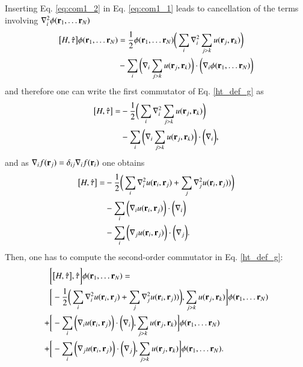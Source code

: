 \documentclass[aip,jcp,reprint,noshowkeys,superscriptaddress]{revtex4-1}
\newcommand{\br}[0]{{\bf {r}}}
\begin{document}
Inserting Eq. \eqref{eq:com1_2} in Eq. \eqref{eq:com1_1} leads to cancellation of the terms involving $\nabla^2_i \phi(\br{}_1,\hdots \br{}_N)$
\begin{equation}
 \label{eq:com1_3}
  \begin{aligned}
 \big[ H,\hat{\tau} \big]\phi(\br{}_1,\hdots \br{}_N) & =  \frac{1}{2}\phi(\br{}_1,\hdots \br{}_N) \bigg( \sum_i \nabla^2_i \sum_{j>k} u(\br{}_j,\br{}_k) \bigg) \\
  & -\sum_i \bigg(\nabla_i \sum_{j>k} u(\br{}_j,\br{}_k) \bigg) \cdot \bigg( \nabla_i \phi(\br{}_1,\hdots \br{}_N) \bigg)
 \end{aligned}
\end{equation}
and therefore one can write the first commutator of Eq. \eqref{ht_def_g} as 
\begin{equation}
 \label{eq:com1_4}
 \begin{aligned}
  \big[ H,\hat{\tau} \big] =& -\frac{1}{2} \bigg( \sum_i \nabla^2_i \sum_{j>k} u(\br{}_j,\br{}_k) \bigg) \\
                            & -\sum_i \bigg(\nabla_i \sum_{j>k} u(\br{}_j,\br{}_k) \bigg) \cdot \bigg( \nabla_i  \bigg),
 \end{aligned}
\end{equation}
and as $\nabla_i f(\br{}_j) = \delta_{ij} \nabla_i f(\br{}_i)$ one obtains 
\begin{equation}
 \label{eq:com1_5}
 \begin{aligned}
  \big[ H,\hat{\tau} \big] =& -\frac{1}{2} \bigg( \sum_i \nabla^2_i u(\br{}_i,\br{}_j) + \sum_j \nabla^2_j u(\br{}_i,\br{}_j) ) \bigg) \\
                            & -\sum_i \bigg(\nabla_i u(\br{}_i,\br{}_j)\bigg) \cdot \bigg( \nabla_i  \bigg) \\
                            & -\sum_i \bigg(\nabla_j u(\br{}_i,\br{}_j)\bigg) \cdot \bigg( \nabla_j  \bigg).  
 \end{aligned}
\end{equation}
Then, one has to compute the second-order commutator in Eq. \eqref{ht_def_g}: 
\begin{equation}
 \label{eq:com2_1}
 \begin{aligned}
 & \bigg[ \big[H,\hat{\tau}\big],\hat{\tau}\bigg] \phi(\br{}_1,\hdots \br{}_N) = \\
 & \bigg[ -\frac{1}{2} \bigg( \sum_i \nabla^2_i u(\br{}_i,\br{}_j) + \sum_j \nabla^2_j u(\br{}_i,\br{}_j) ) \bigg), \sum_{j>k} u(\br{}_j,\br{}_k)  \bigg] \phi(\br{}_1,\hdots \br{}_N) \\
+& \bigg[ -\sum_i \bigg(\nabla_i u(\br{}_i,\br{}_j)\bigg) \cdot \bigg( \nabla_i  \bigg), \sum_{j>k} u(\br{}_j,\br{}_k) \bigg] \phi(\br{}_1,\hdots \br{}_N) \\
+& \bigg[ -\sum_i \bigg(\nabla_j u(\br{}_i,\br{}_j)\bigg) \cdot \bigg( \nabla_j  \bigg), \sum_{j>k} u(\br{}_j,\br{}_k) \bigg] \phi(\br{}_1,\hdots \br{}_N). 
 \end{aligned}
\end{equation}
\end{document}
